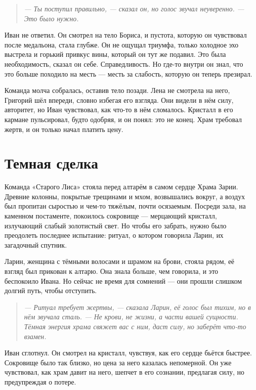 \documentclass[12pt,a4paper]{book}
\newenvironment{dialogue}{\begin{quote}\itshape}{\end{quote}} %
\begin{document}
\begin{dialogue}
--- Ты поступил правильно, --- сказал он, но голос звучал неуверенно. --- Это было нужно.
\end{dialogue}

Иван не ответил. Он смотрел на тело Бориса, и пустота, которую он чувствовал после медальона, стала глубже. Он не ощущал триумфа, только холодное эхо выстрела и горький привкус вины, который он тут же подавил. Это была необходимость, сказал он себе. Справедливость. Но где-то внутри он знал, что это больше походило на месть --- месть за слабость, которую он теперь презирал.

Команда молча собралась, оставив тело позади. Лена не смотрела на него, Григорий шёл впереди, словно избегая его взгляда. Они видели в нём силу, авторитет, но Иван чувствовал, как что-то в нём сломалось. Кристалл в его кармане пульсировал, будто одобряя, и он понял: это не конец. Храм требовал жертв, и он только начал платить цену.

\chapter{Темная сделка}

Команда «Старого Лиса» стояла перед алтарём в самом сердце Храма Зарии. Древние колонны, покрытые трещинами и мхом, возвышались вокруг, а воздух был пропитан сыростью и чем-то тяжёлым, почти осязаемым. Посреди зала, на каменном постаменте, покоилось сокровище --- мерцающий кристалл, излучающий слабый золотистый свет. Но чтобы его забрать, нужно было преодолеть последнее испытание: ритуал, о котором говорила Ларин, их загадочный спутник.

Ларин, женщина с тёмными волосами и шрамом на брови, стояла рядом, её взгляд был прикован к алтарю. Она знала больше, чем говорила, и это беспокоило Ивана. Но сейчас не время для сомнений --- они прошли слишком долгий путь, чтобы отступить.

\begin{dialogue}
--- Ритуал требует жертвы, --- сказала Ларин, её голос был тихим, но в нём звучала сталь. --- Не крови, не жизни, а части вашей сущности. Тёмная энергия храма свяжет вас с ним, даст силу, но заберёт что-то взамен.
\end{dialogue}

Иван сглотнул. Он смотрел на кристалл, чувствуя, как его сердце бьётся быстрее. Сокровище было так близко, но цена за него казалась непомерной. Он уже чувствовал, как храм давит на него, шепчет в его сознании, предлагая силу, но предупреждая о потере.
\end{document}
